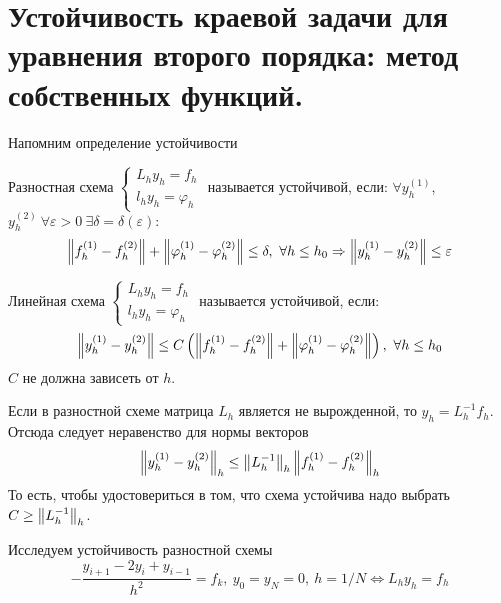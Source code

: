 \section{Устойчивость краевой задачи для уравнения второго порядка: метод собственных функций.}

Напомним определение устойчивости
\begin{definition}
  Разностная схема $\begin{cases}
      L_hy_h = f_h \\
      l_hy_h = \varphi_h
    \end{cases}$
  называется устойчивой, если:
  $\forall y_h^{(1)}$, $y_h^{(2)}\ \forall \varepsilon > 0\ \exists\delta=\delta(\varepsilon):$
  \[\norm{f^{(1)}_h-f^{(2)}_h}+\norm{\varphi^{(1)}_h-\varphi^{(2)}_h}\leq\delta,\ \forall h\leq h_0\Rightarrow\norm{y^{(1)}_h-y^{(2)}_h}\leq\varepsilon\]
\end{definition}
\begin{definition}
  Линейная схема $\begin{cases}
      L_hy_h = f_h \\
      l_hy_h = \varphi_h
    \end{cases}$
  называется устойчивой, если:
  \[\norm{y^{(1)}_h-y^{(2)}_h}\leq C\left(\norm{f^{(1)}_h-f^{(2)}_h}+\norm{\varphi^{(1)}_h-\varphi^{(2)}_h}\right),\ \forall h\leq h_0\]
  $C$ не должна зависеть от $h$.
\end{definition}
Если в разностной схеме матрица $L_h$ является не вырожденной, то $y_h=L_h^{-1}f_h$.
Отсюда следует неравенство для нормы векторов
\[\left\lVert y_h^{(1)}-y_h^{(2)}\right\rVert_h\leq\left\lVert L^{-1}_h\right\rVert_h\left\lVert f_h^{(1)}-f_h^{(2)}\right\rVert_h\]
То есть, чтобы удостовериться в том, что схема устойчива надо выбрать $C\geq \left\lVert L_h^{-1}\right\rVert_h$.

Исследуем устойчивость разностной схемы
\begin{equation}\label{eq:scheme}
  -\frac{y_{i+1}-2y_i+y_{i-1}}{h^2}=f_k,\ y_0=y_N=0,\ h=1/N \Leftrightarrow L_hy_h=f_h
\end{equation}

